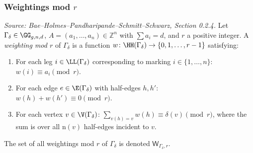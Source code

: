 \subsubsection{Weightings mod $r$}

\begin{definition}
  \label{def:weighting_mod_r}
  \textit{Source: Bae--Holmes--Pandharipande--Schmitt--Schwarz, Section 0.2.4.}
  Let $\Gamma_\delta \in \GG_{g,n,d}$, $A = (a_1,\ldots,a_n) \in \mathbb{Z}^n$ with
  $\sum a_i = d$, and $r$ a positive integer.
  A \emph{weighting mod $r$} of $\Gamma_\delta$ is a function
  $w\colon \HH(\Gamma_\delta) \to \{0,1,\ldots,r-1\}$ satisfying:
  \begin{enumerate}
  \item[(i)] For each leg $i \in \LL(\Gamma_\delta)$ corresponding to marking $i \in \{1,\ldots,n\}$:
    $w(i) \equiv a_i \pmod{r}$.
  \item[(ii)] For each edge $e \in \E(\Gamma_\delta)$ with half-edges $h, h'$:
    $w(h) + w(h') \equiv 0 \pmod{r}$.
  \item[(iii)] For each vertex $v \in \V(\Gamma_\delta)$:
    $\sum_{v(h) = v} w(h) \equiv \delta(v) \pmod{r}$,
    where the sum is over all $\mathrm{n}(v)$ half-edges incident to $v$.
  \end{enumerate}
  The set of all weightings mod $r$ of $\Gamma_\delta$ is denoted
  $\mathsf{W}_{\Gamma_\delta,r}$.
\end{definition}

